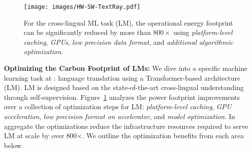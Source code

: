 \begin{figure}[t]
    \centering
    \texttt{[image: images/HW-SW-TextRay.pdf]}
    \caption{For the cross-lingual ML task (LM), the operational energy footprint can be significantly reduced by more than $800\times$ using \textit{platform-level caching}, \textit{GPUs}, \textit{low precision data format}, and \textit{additional algorithmic optimization}.}
    \label{fig:textray-optimization}
\end{figure}


\textbf{Optimizing the Carbon Footprint of \mbox{LMs}:} 
We dive into a specific machine learning task at \fb: language translation using a Transformer-based architecture (\mbox{LM}).
\mbox{LM} is designed based on the state-of-the-art cross-lingual understanding through self-supervision. 
Figure~\ref{fig:textray-optimization} analyzes the power footprint improvements over a collection of optimization steps for \mbox{LM}: \textit{platform-level caching}, \textit{GPU acceleration}, \textit{low precision format on accelerator}, and \textit{model optimization}. 
In aggregate the optimizations reduce the infrastructure resources required to serve \mbox{LM} at scale by over 800$\times$.
We outline the optimization benefits from each area below.
